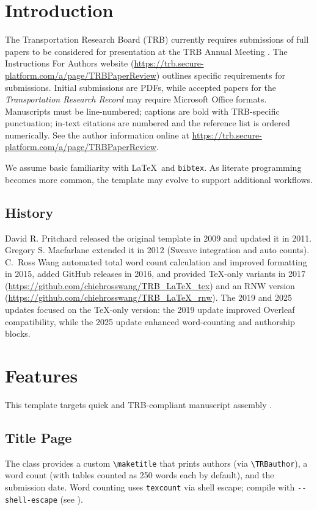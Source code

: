 \documentclass[numbered]{trbunofficial}
\begin{document}
\newpage

\section{Introduction}\label{sec:intro}
The Transportation Research Board (TRB) currently requires submissions of full papers to be considered for presentation at the TRB Annual Meeting \cite{trbwebsite}.  The Instructions For Authors website (\url{https://trb.secure-platform.com/a/page/TRBPaperReview}) outlines specific requirements for submissions. Initial submissions are PDFs, while accepted papers for the \textit{Transportation Research Record} may require Microsoft Office formats. Manuscripts must be line-numbered; captions are bold with TRB-specific punctuation; in-text citations are numbered and the reference list is ordered numerically. See the author information online at \url{https://trb.secure-platform.com/a/page/TRBPaperReview}.

We assume basic familiarity with \LaTeX\ and \verb|bibtex|. As literate programming becomes more common, the template may evolve to support additional workflows.


\subsection{History}
David R. Pritchard \cite{pritchard} released the original template in 2009 and updated it in 2011. Gregory S. Macfarlane \cite{macfarlane} extended it in 2012 (Sweave integration and auto counts). C.\ Ross Wang \cite{wang} automated total word count calculation and improved formatting in 2015, added GitHub releases in 2016, and provided \TeX-only variants in 2017 (\url{https://github.com/chiehrosswang/TRB_LaTeX_tex}) and an RNW version (\url{https://github.com/chiehrosswang/TRB_LaTeX_rnw}). The 2019 and 2025 updates focused on the \TeX-only version: the 2019 update improved Overleaf compatibility, while the 2025 update enhanced word-counting and authorship blocks.

\section{Features}
This template targets quick and TRB-compliant manuscript assembly \cite{trbwebsite}.

\subsection{Title Page}
The class provides a custom \verb|\maketitle| that prints authors (via \verb|\TRBauthor|), a word count (with tables counted as 250 words each by default), and the submission date. Word counting uses \verb|texcount| via shell escape; compile with \verb|--shell-escape| (see ).
\end{document}
